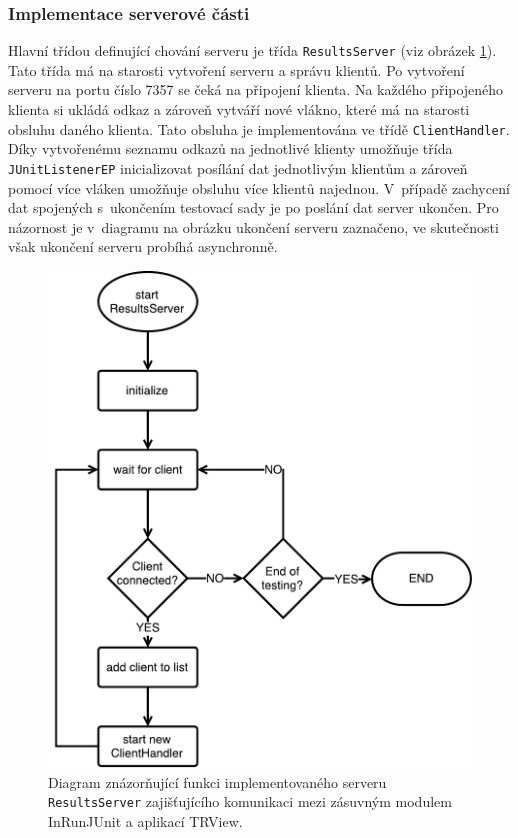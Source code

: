       \subsubsection{Implementace serverové části}
	Hlavní třídou definující chování serveru je třída \texttt{ResultsServer} (viz obrázek \ref{fig:resultsserver_flowchart}). Tato třída má na starosti vytvoření serveru a správu klientů. Po vytvoření serveru na portu číslo 7357 se čeká na připojení klienta. Na každého připojeného klienta si ukládá odkaz a zároveň vytváří nové vlákno, které má na starosti obsluhu daného klienta. Tato obsluha je implementována ve třídě \texttt{ClientHandler}. Díky vytvořenému seznamu odkazů na jednotlivé klienty umožňuje třída \texttt{JUnitListenerEP} inicializovat posílání dat jednotlivým klientům a zároveň pomocí více vláken umožňuje obsluhu více klientů najednou. V~případě zachycení dat spojených s~ukončením testovací sady je po poslání dat server ukončen. Pro názornost je v~diagramu na obrázku ukončení serveru zaznačeno, ve skutečnosti však ukončení serveru probíhá asynchronně.
	
	\begin{figure}
	  \includegraphics[width=\textwidth, height=0.6\textheight, keepaspectratio, center]{obrazky-figures/inrunjunit_resultsserver_flowchart.pdf}
	  \caption{Diagram znázorňující funkci implementovaného serveru \texttt{ResultsServer} zajišťujícího komunikaci mezi zásuvným modulem InRunJUnit a aplikací TRView.}
	  \label{fig:resultsserver_flowchart}
	\end{figure}


